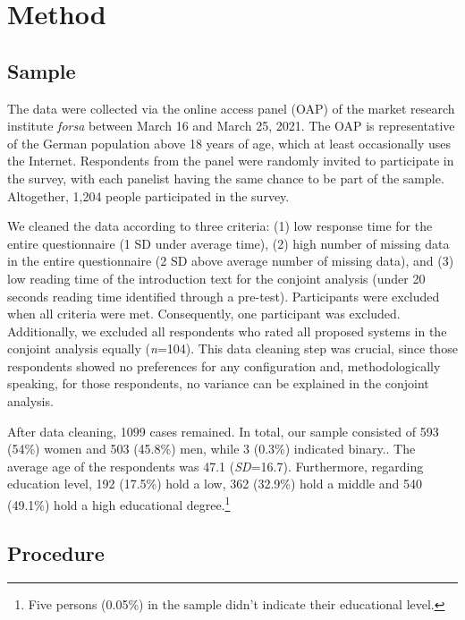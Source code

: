 \documentclass{article}
\begin{document}
\hypertarget{method}{%
\section{Method}\label{method}}

\hypertarget{sample}{%
\subsection{Sample}\label{sample}}

The data were collected via the online access panel (OAP) of the market
research institute \emph{forsa} between March 16 and March 25, 2021. The
OAP is representative of the German population above 18 years of age,
which at least occasionally uses the Internet. Respondents from the
panel were randomly invited to participate in the survey, with each
panelist having the same chance to be part of the sample. Altogether,
1,204 people participated in the survey.

We cleaned the data according to three criteria: (1) low response time
for the entire questionnaire (1 SD under average time), (2) high number
of missing data in the entire questionnaire (2 SD above average number
of missing data), and (3) low reading time of the introduction text for
the conjoint analysis (under 20 seconds reading time identified through
a pre-test). Participants were excluded when all criteria were met.
Consequently, one participant was excluded. Additionally, we excluded
all respondents who rated all proposed systems in the conjoint analysis
equally (\emph{n}=104). This data cleaning step was crucial, since those
respondents showed no preferences for any configuration and,
methodologically speaking, for those respondents, no variance can be
explained in the conjoint analysis.

After data cleaning, 1099 cases remained. In total, our sample consisted
of 593 (54\%) women and 503 (45.8\%) men, while 3 (0.3\%) indicated
binary.. The average age of the respondents was 47.1 (\emph{SD}=16.7).
Furthermore, regarding education level, 192 (17.5\%) hold a low, 362
(32.9\%) hold a middle and 540 (49.1\%) hold a high educational
degree.\footnote{Five persons (0.05\%) in the sample didn't indicate
  their educational level.}

\hypertarget{procedure}{%
\subsection{Procedure}\label{procedure}}
\end{document}
